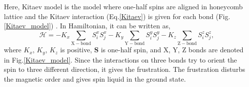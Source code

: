 Here, Kitaev model is the model where one-half spins are aligned in honeycomb lattice and the Kitaev interaction (Eq.\ref{Kitaev}) is given for each bond (Fig.\ref{Kitaev_model})
\cite{kitaev2006anyons}.
In Hamiltonian, it can be written as,
\begin{equation}
\mathcal{H} = -K_x\sum_\mathrm{X-bond} S^x_iS^x_j - K_y\sum_\mathrm{Y-bond} S^y_iS^y_j - K_z\sum_\mathrm{Z-bond} S^z_iS^z_j,
\label{Kitaev_H}
\end{equation}
where $K_x$, $K_y$, $K_z$ is positive, $\bm{S}$ is one-half spin, and X, Y, Z bonds are denoted in Fig.\ref{Kitaev_model}.
Since the interactions on three bonds try to orient the spin to three different direction, it gives the frustration.
The frustration disturbs the magnetic order and gives spin liquid in the ground state.

